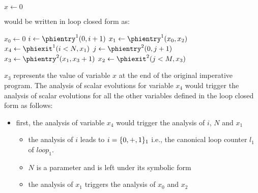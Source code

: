 {\begin{algorithm}[H]
$x\gets 0$\;
\end{algorithm}

would be written in loop closed \SSA{} form as:

\begin{algorithm}[H]
  $x_0 \gets 0$\;
  $i \gets \phientry^1 (0, i + 1)$\;
  $x_1 \gets \phientry^1 (x_0, x_2)$\;
  $x_4 \gets \phiexit^1 (i < N, x_1)$\;
  $j \gets \phientry^2 (0, j + 1)$\;
  $x_3 \gets \phientry^2 (x_1, x_3 + 1)$\;
  $x_2 \gets \phiexit^2 (j < M, x_3)$\;
\end{algorithm}
$x_3$ represents the value of variable $x$ at the end of the original imperative program. 
The analysis of scalar evolutions for variable $x_4$ would trigger the analysis of scalar evolutions for all the other variables defined in the loop closed \SSA{} form as follows:
\begin{itemize}
\item first, the analysis of variable $x_4$ would trigger the analysis
  of $i$, $N$ and $x_1$
  \begin{itemize}
  \item the analysis of $i$ leads to $i = \{0, +, 1\}_1$ i.e., the canonical loop counter $l_1$ of $\textit{loop}_1$.
  \item $N$ is a parameter and is left under its symbolic form
  \item the analysis of $x_1$ triggers the analysis of $x_0$ and $x_2$
    \begin{itemize}

\end{itemize}
\end{itemize}
\end{itemize}}
